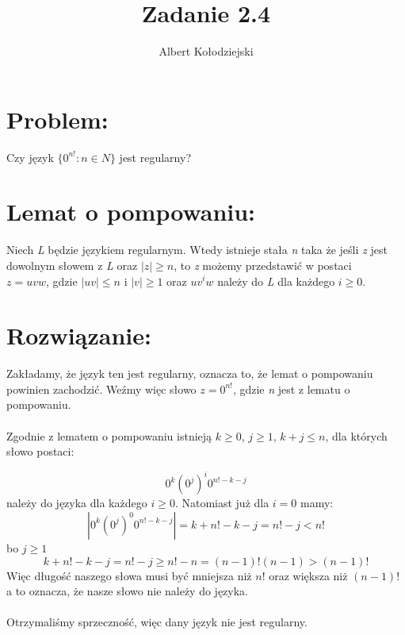 \documentclass{article}
\title{Zadanie 2.4}
\author{Albert Kołodziejski}
\date{}
\begin{document}
\maketitle
\section*{Problem:}
Czy język \textit{\(\{ 0^{n!} : n \in N\}\)} jest regularny?
\section*{Lemat o pompowaniu:}

Niech \textit{L} będzie językiem regularnym. Wtedy istnieje stała \textit{n} taka że jeśli \textit{z} jest dowolnym słowem z \textit{L} oraz \textit{\(|z| \ge n\)}, to \textit{z} możemy przedstawić w postaci \\
\textit{\(z = uvw\)}, gdzie \textit{\(|uv| \le n\)} i \textit{\(|v| \ge 1\)} oraz \textit{\(uv^iw\)} należy do \textit{L} dla każdego \textit{\(i \ge 0\)}.

\section*{Rozwiązanie:}
Zakładamy, że język ten jest regularny, oznacza to, że lemat o pompowaniu powinien zachodzić. Weźmy więc słowo \textit{\(z = 0^{n!}\)}, gdzie \textit{n} jest z lematu o pompowaniu.
\\
\\
Zgodnie z lematem o pompowaniu istnieją \textit{\(k \ge 0\)}, \textit{\(j \ge 1\)}, \textit{\(k + j \le n\)}, dla których słowo postaci:

\[
    0^k(0^j)^i0^{n! - k - j}
\]
należy do języka dla każdego \textit{\(i \ge 0\)}. Natomiast już dla \textit{\(i = 0\)} mamy:
\[
    |0^k(0^j)^{0}0^{n! - k - j}| = k + n! - k - j = n! - j < n!
\]
bo \textit{\(j \ge 1\)}
\[
    k + n! - k - j = n! - j \ge n! - n = (n-1)!(n-1) > (n-1)!
\]
Więc długość naszego słowa musi być mniejsza niż \textit{\(n!\)} oraz większa niż \textit{\((n - 1)!\)} a to oznacza, że nasze słowo nie należy do języka.
\\
\\
Otrzymaliśmy sprzeczność, więc dany język nie jest regularny.
\end{document}
